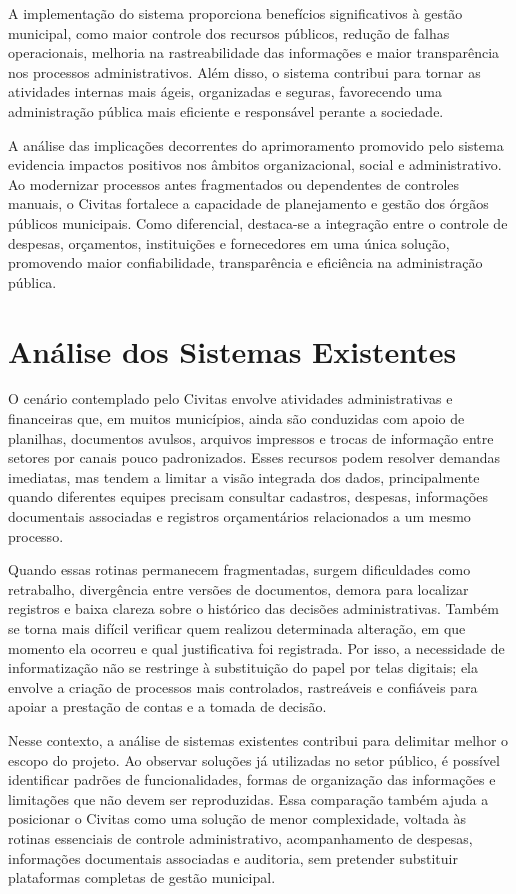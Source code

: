 A implementação do sistema proporciona benefícios significativos à gestão municipal, como maior controle dos recursos públicos, redução de falhas operacionais, melhoria na rastreabilidade das informações e maior transparência nos processos administrativos. Além disso, o sistema contribui para tornar as atividades internas mais ágeis, organizadas e seguras, favorecendo uma administração pública mais eficiente e responsável perante a sociedade.

A análise das implicações decorrentes do aprimoramento promovido pelo sistema evidencia impactos positivos nos âmbitos organizacional, social e administrativo. Ao modernizar processos antes fragmentados ou dependentes de controles manuais, o Civitas fortalece a capacidade de planejamento e gestão dos órgãos públicos municipais. Como diferencial, destaca-se a integração entre o controle de despesas, orçamentos, instituições e fornecedores em uma única solução, promovendo maior confiabilidade, transparência e eficiência na administração pública.

\section{Análise dos Sistemas Existentes}

O cenário contemplado pelo Civitas envolve atividades administrativas e financeiras que, em muitos municípios, ainda são conduzidas com apoio de planilhas, documentos avulsos, arquivos impressos e trocas de informação entre setores por canais pouco padronizados. Esses recursos podem resolver demandas imediatas, mas tendem a limitar a visão integrada dos dados, principalmente quando diferentes equipes precisam consultar cadastros, despesas, informações documentais associadas e registros orçamentários relacionados a um mesmo processo.

Quando essas rotinas permanecem fragmentadas, surgem dificuldades como retrabalho, divergência entre versões de documentos, demora para localizar registros e baixa clareza sobre o histórico das decisões administrativas. Também se torna mais difícil verificar quem realizou determinada alteração, em que momento ela ocorreu e qual justificativa foi registrada. Por isso, a necessidade de informatização não se restringe à substituição do papel por telas digitais; ela envolve a criação de processos mais controlados, rastreáveis e confiáveis para apoiar a prestação de contas e a tomada de decisão.

Nesse contexto, a análise de sistemas existentes contribui para delimitar melhor o escopo do projeto. Ao observar soluções já utilizadas no setor público, é possível identificar padrões de funcionalidades, formas de organização das informações e limitações que não devem ser reproduzidas. Essa comparação também ajuda a posicionar o Civitas como uma solução de menor complexidade, voltada às rotinas essenciais de controle administrativo, acompanhamento de despesas, informações documentais associadas e auditoria, sem pretender substituir plataformas completas de gestão municipal.

